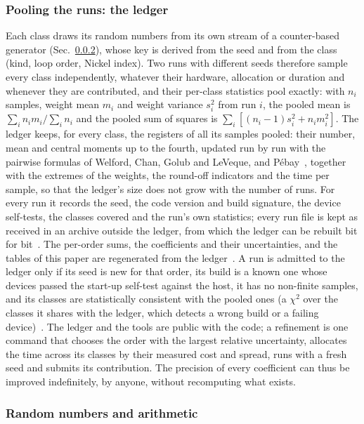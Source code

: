 \subsubsection{Pooling the runs: the ledger}
\label{sec:methods-ledger}
Each class draws its random numbers from its own stream of a counter-based generator (Sec.~\ref{sec:methods-rng}),
whose key is derived from the seed and from the class (kind, loop order, Nickel index). Two runs with different seeds therefore sample every
class independently, whatever their hardware, allocation or duration and whenever they are contributed, and their per-class statistics pool exactly:
with $n_i$ samples, weight mean $m_i$ and weight variance $s_i^2$ from run $i$, the pooled mean is
$\sum_i n_i m_i/\sum_i n_i$ and the pooled sum of squares is $\sum_i [(n_i-1)s_i^2+n_i m_i^2]$. The ledger keeps,
for every class, the registers of all its samples pooled: their number, mean and central moments up to the fourth,
updated run by run with the pairwise formulas of Welford, Chan, Golub and LeVeque, and
P\'ebay~\cite{Welford1962,ChanGolubLeVeque1979,Pebay2008}, together with the extremes of the weights, the round-off
indicators and the time per sample, so that the ledger's size does not grow with the number of runs. For every run it records
the seed, the code version and build signature, the device self-tests, the classes covered and the run's own
statistics; every run file is kept as received in an archive outside the ledger, from which the ledger can be rebuilt
bit for bit~. The per-order sums, the coefficients and their uncertainties, and the tables of this paper are
regenerated from the ledger~. A run is admitted to the ledger only if its seed is new for that
order, its build is a known one whose devices passed the start-up self-test against the host, it has no non-finite
samples, and its classes are statistically consistent with the pooled ones (a $\chi^2$ over the classes it shares with
the ledger, which detects a wrong build or a failing device)~. The ledger and the tools are public with the code; a
refinement is one command that chooses the order with the largest relative uncertainty, allocates the time across its
classes by their measured cost and spread, runs with a fresh seed and submits its contribution. The precision of every
coefficient can thus be improved indefinitely, by anyone, without recomputing what exists.

\subsubsection{Random numbers and arithmetic}
\label{sec:methods-rng}

